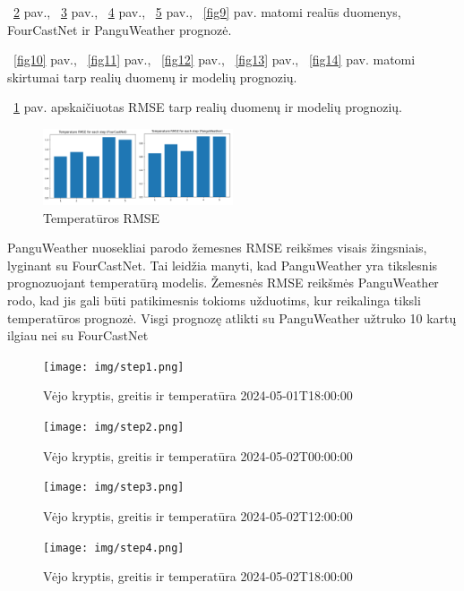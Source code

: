 \documentclass[conference]{IEEEtran}
\begin{document}
~\ref{fig5} pav., ~\ref{fig6} pav., ~\ref{fig7} pav., ~\ref{fig8} pav., ~\ref{fig9} pav. matomi realūs duomenys, FourCastNet ir PanguWeather prognozė.

~\ref{fig10} pav., ~\ref{fig11} pav., ~\ref{fig12} pav., ~\ref{fig13} pav., ~\ref{fig14} pav. matomi skirtumai tarp realių duomenų ir modelių prognozių.

~\ref{fig4} pav. apskaičiuotas RMSE tarp realių duomenų ir modelių prognozių. 
\begin{figure}[htb!] %
\centerline{\includegraphics[width=0.5\textwidth]{img/RMSE.png}}
\caption{Temperatūros RMSE}
\label{fig4}
\end{figure}

PanguWeather nuosekliai parodo žemesnes RMSE reikšmes visais žingsniais, lyginant su FourCastNet. Tai leidžia manyti, kad PanguWeather yra tikslesnis prognozuojant temperatūrą modelis. Žemesnės RMSE reikšmės PanguWeather rodo, kad jis gali būti patikimesnis tokioms užduotims, kur reikalinga tiksli temperatūros prognozė. Visgi prognozę atlikti su PanguWeather užtruko 10 kartų ilgiau nei su FourCastNet 

\begin{figure}[!t]
\centerline{\texttt{[image: img/step1.png]}}
\caption{Vėjo kryptis, greitis ir temperatūra 2024-05-01T18:00:00}
\label{fig5}
\end{figure}

\begin{figure}[htb!] %
\centerline{\texttt{[image: img/step2.png]}}
\caption{Vėjo kryptis, greitis ir temperatūra 2024-05-02T00:00:00}
\label{fig6}
\end{figure}

\begin{figure}[htb!] %
\centerline{\texttt{[image: img/step3.png]}}
\caption{Vėjo kryptis, greitis ir temperatūra 2024-05-02T12:00:00}
\label{fig7}
\end{figure}

\begin{figure}[htb!] %
\centerline{\texttt{[image: img/step4.png]}}
\caption{Vėjo kryptis, greitis ir temperatūra 2024-05-02T18:00:00}
\label{fig8}
\end{figure}
\end{document}
